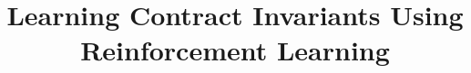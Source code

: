 \documentclass[runningheads]{llncs}
\begin{document}
\title
{Learning Contract Invariants Using Reinforcement Learning}







\maketitle













% 
\end{document}
